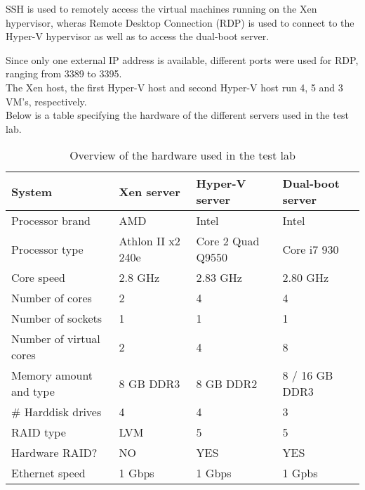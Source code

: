 SSH is used to remotely access the virtual machines running on the Xen hypervisor, wheras Remote Desktop Connection (RDP) is used to connect to the Hyper-V hypervisor as well as to access the dual-boot server.

Since only one external IP address is available, different ports were used for RDP, ranging from 3389 to 3395. \\
The Xen host, the first Hyper-V host and second Hyper-V host run 4, 5 and 3 VM's, respectively. \\
Below is a table specifying the hardware of the different servers used in the test lab.

\begin{table}[h]
\begin{tabular}{|l|l|l|l|}
\hline
System                  & Xen server                & Hyper-V server             & Dual-boot server \\ \hline
Processor brand         & AMD                       & Intel                      & Intel            \\ \hline
Processor type          & Athlon II x2 240e & Core 2 Quad Q9550 & Core i7 930    \\ \hline
Core speed	&	2.8 GHz	&	2.83 GHz 	&	2.80 GHz \\ \hline
Number of cores         & 2                         & 4                          & 4                \\ \hline
Number of sockets    & 1                         & 1                          & 1                \\ \hline
Number of virtual cores & 2                         & 4                          & 8                \\ \hline
Memory amount and type  & 8 GB DDR3                 & 8 GB DDR2                  & 8 / 16 GB DDR3       \\ \hline
\# Harddisk drives      & 4                         & 4                          &    3              \\ \hline
RAID type               & LVM                       & 5                          & 5                \\ \hline
Hardware RAID?          & NO                        & YES                        & YES              \\ \hline
Ethernet speed          & 1 Gbps                    & 1 Gbps                    & 1 Gpbs          \\ \hline
\end{tabular}
\caption{Overview of the hardware used in the test lab}
\end{table}

